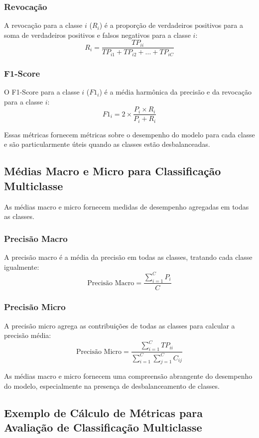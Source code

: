\subsubsection{Revocação}

A revocação para a classe \(i\) (\(R_i\)) é a proporção de verdadeiros positivos para a soma de verdadeiros positivos e falsos negativos para a classe \(i\):
\[ R_i = \frac{TP_{ii}}{TP_{i1} + TP_{i2} + \ldots + TP_{iC}} \]

\subsubsection{F1-Score}

O F1-Score para a classe \(i\) (\(F1_i\)) é a média harmônica da precisão e da revocação para a classe \(i\):
\[ F1_i = 2 \times \frac{P_i \times R_i}{P_i + R_i} \]

Essas métricas fornecem métricas sobre o desempenho do modelo para cada classe e são particularmente úteis quando as classes estão desbalanceadas.

\subsection{Médias Macro e Micro para Classificação Multiclasse}

As médias macro e micro fornecem medidas de desempenho agregadas em todas as classes.

\subsubsection{Precisão Macro}

A precisão macro é a média da precisão em todas as classes, tratando cada classe igualmente:
\[ \text{Precisão Macro} = \frac{\sum_{i=1}^{C} P_i}{C} \]

\subsubsection{Precisão Micro}

A precisão micro agrega as contribuições de todas as classes para calcular a precisão média:
\[ \text{Precisão Micro} = \frac{\sum_{i=1}^{C} TP_{ii}}{\sum_{i=1}^{C} \sum_{j=1}^{C} C_{ij}} \]

As médias macro e micro fornecem uma compreensão abrangente do desempenho do modelo, especialmente na presença de desbalanceamento de classes.

\subsection{Exemplo de Cálculo de Métricas para Avaliação de Classificação Multiclasse}

